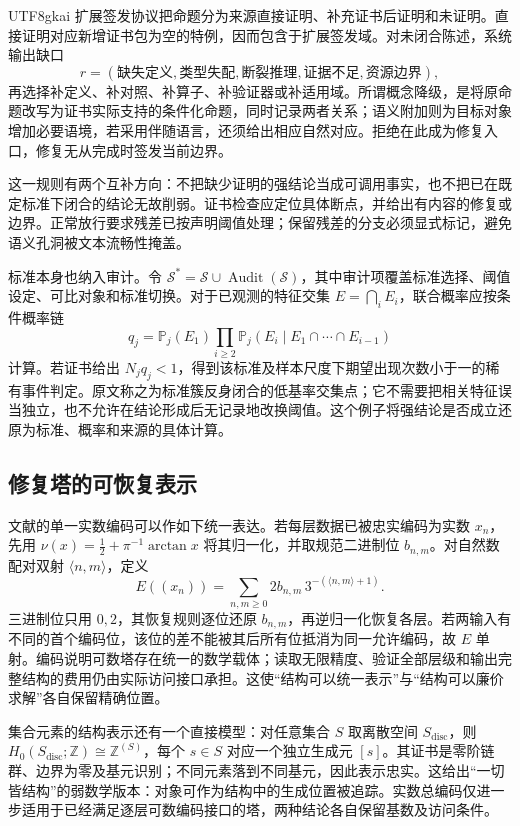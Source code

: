 \documentclass[11pt,a4paper]{article}
\theoremstyle{plain}
\theoremstyle{definition}
\theoremstyle{remark}
\begin{document}
\begin{CJK*}{UTF8}{gkai}
扩展签发协议把命题分为来源直接证明、补充证书后证明和未证明。直接证明对应新增证书包为空的特例，因而包含于扩展签发域。对未闭合陈述，系统输出缺口
\[
 r=(\text{缺失定义},\text{类型失配},\text{断裂推理},
       \text{证据不足},\text{资源边界}),
\]
再选择补定义、补对照、补算子、补验证器或补适用域。所谓概念降级，是将原命题改写为证书实际支持的条件化命题，同时记录两者关系；语义附加则为目标对象增加必要语境，若采用伴随语言，还须给出相应自然对应。拒绝在此成为修复入口，修复无从完成时签发当前边界。

这一规则有两个互补方向：不把缺少证明的强结论当成可调用事实，也不把已在既定标准下闭合的结论无故削弱。证书检查应定位具体断点，并给出有内容的修复或边界。正常放行要求残差已按声明阈值处理；保留残差的分支必须显式标记，避免语义孔洞被文本流畅性掩盖。

标准本身也纳入审计。令 $\mathcal S^*=\mathcal S\cup\operatorname{Audit}(\mathcal S)$，其中审计项覆盖标准选择、阈值设定、可比对象和标准切换。对于已观测的特征交集 $E=\bigcap_iE_i$，联合概率应按条件概率链
\[
 q_j=\mathbb P_j(E_1)\prod_{i\ge2}\mathbb P_j(E_i\mid E_1\cap\cdots\cap E_{i-1})
\]
计算。若证书给出 $N_jq_j<1$，得到该标准及样本尺度下期望出现次数小于一的稀有事件判定。原文称之为标准簇反身闭合的低基率交集点；它不需要把相关特征误当独立，也不允许在结论形成后无记录地改换阈值。这个例子将强结论是否成立还原为标准、概率和来源的具体计算。

\subsection{修复塔的可恢复表示}

文献\cite{S22}的单一实数编码可以作如下统一表达。若每层数据已被忠实编码为实数 $x_n$，先用 $\nu(x)=\frac12+\pi^{-1}\arctan x$ 将其归一化，并取规范二进制位 $b_{n,m}$。对自然数配对双射 $\langle n,m\rangle$，定义
\[
 E((x_n))=\sum_{n,m\ge0}2b_{n,m}\,3^{-(\langle n,m\rangle+1)}.
\]
三进制位只用 $0,2$，其恢复规则逐位还原 $b_{n,m}$，再逆归一化恢复各层。若两输入有不同的首个编码位，该位的差不能被其后所有位抵消为同一允许编码，故 $E$ 单射。编码说明可数塔存在统一的数学载体；读取无限精度、验证全部层级和输出完整结构的费用仍由实际访问接口承担。这使“结构可以统一表示”与“结构可以廉价求解”各自保留精确位置。

集合元素的结构表示还有一个直接模型：对任意集合 $S$ 取离散空间 $S_{\mathrm{disc}}$，则 $H_0(S_{\mathrm{disc}};\mathbb Z)\cong\mathbb Z^{(S)}$，每个 $s\in S$ 对应一个独立生成元 $[s]$。其证书是零阶链群、边界为零及基元识别；不同元素落到不同基元，因此表示忠实。这给出“一切皆结构”的弱数学版本：对象可作为结构中的生成位置被追踪。实数总编码仅进一步适用于已经满足逐层可数编码接口的塔，两种结论各自保留基数及访问条件。


\end{CJK*}
\end{document}

